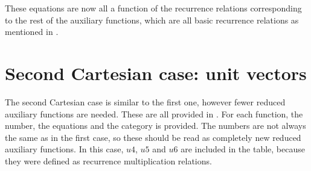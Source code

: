 These equations are now all a function of the recurrence relations corresponding to the rest of the auxiliary functions, which are all basic recurrence relations as mentioned in . \\



\section{Second Cartesian case: unit vectors}
\label{sec:secCartApp}
The second Cartesian case is similar to the first one, however fewer reduced auxiliary functions are needed. These are all provided in . For each function, the number, the equations and the category is provided. The numbers are not always the same as in the first case, so these should be read as completely new reduced auxiliary functions. In this case, $u4$, $u5$ and $u6$ are included in the table, because they were defined as recurrence multiplication relations.


